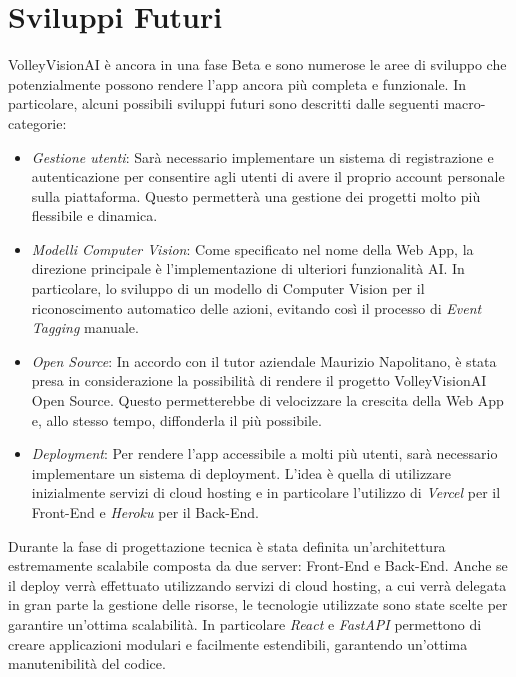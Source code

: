 \section{Sviluppi Futuri}

VolleyVisionAI è ancora in una fase Beta e sono numerose le aree di sviluppo che potenzialmente possono rendere l'app ancora più completa e funzionale. In particolare, alcuni possibili sviluppi futuri sono descritti dalle seguenti macro-categorie:

\begin{itemize}
    \item \textit{Gestione utenti}: Sarà necessario implementare un sistema di registrazione e autenticazione per consentire agli utenti di avere il proprio account personale sulla piattaforma. Questo permetterà una gestione dei progetti molto più flessibile e dinamica.
    \item \textit{Modelli Computer Vision}: Come specificato nel nome della Web App, la direzione principale è l'implementazione di ulteriori funzionalità AI. In particolare, lo sviluppo di un modello di Computer Vision per il riconoscimento automatico delle azioni, evitando così il processo di \textit{Event Tagging} manuale. 
    \item \textit{Open Source}: In accordo con il tutor aziendale Maurizio Napolitano, è stata presa in considerazione la possibilità di rendere il progetto VolleyVisionAI Open Source. Questo permetterebbe di velocizzare la crescita della Web App e, allo stesso tempo, diffonderla il più possibile.
    \item \textit{Deployment}: Per rendere l'app accessibile a molti più utenti, sarà necessario implementare un sistema di deployment. L'idea è quella di utilizzare inizialmente servizi di cloud hosting e in particolare l'utilizzo di \textit{Vercel} per il Front-End e \textit{Heroku} per il Back-End.
\end{itemize}

\noindent Durante la fase di progettazione tecnica è stata definita un'architettura estremamente scalabile composta da due server: Front-End e Back-End. Anche se il deploy verrà effettuato utilizzando servizi di cloud hosting, a cui verrà delegata in gran parte la gestione delle risorse, le tecnologie utilizzate sono state scelte per garantire un'ottima scalabilità. In particolare \textit{React} e \textit{FastAPI} permettono di creare applicazioni modulari e facilmente estendibili, garantendo un'ottima manutenibilità del codice.

